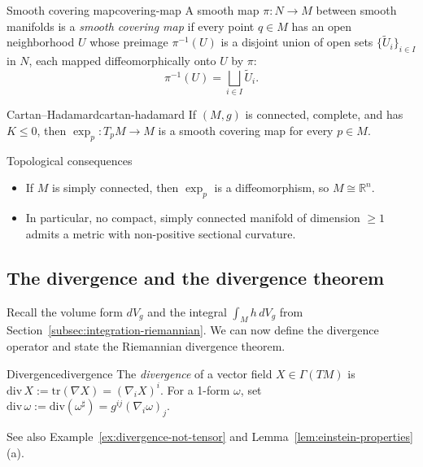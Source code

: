 \begin{colordef}{Smooth covering map}{covering-map}
A smooth map $\pi \colon N \to M$ between smooth manifolds is a \emph{smooth covering map} if every point $q \in M$ has an open neighborhood $U$ whose preimage $\pi^{-1}(U)$ is a disjoint union of open sets $\{\widetilde U_i\}_{i \in I}$ in $N$, each mapped diffeomorphically onto $U$ by $\pi$:
\[
\pi^{-1}(U) = \bigsqcup_{i \in I} \widetilde U_i.
\]
\end{colordef}

\begin{colortheo}{Cartan--Hadamard}{cartan-hadamard}
If $(M, g)$ is connected, complete, and has $K \leqslant 0$, then $\exp_p \colon T_p M \to M$ is a smooth covering map for every $p \in M$.
\end{colortheo}

\begin{colremark}{Topological consequences}{}
\begin{itemize}
    \item If $M$ is simply connected, then $\exp_p$ is a diffeomorphism, so $M \cong \mathbb{R}^n$.
    \item In particular, no compact, simply connected manifold of dimension $\geqslant 1$ admits a metric with non-positive sectional curvature.
\end{itemize}
\end{colremark}


\subsection{The divergence and the divergence theorem}

Recall the volume form $dV_g$ and the integral $\int_M h\, dV_g$ from Section~\ref{subsec:integration-riemannian}. We can now define the divergence operator and state the Riemannian divergence theorem.

\begin{colordef}{Divergence}{divergence}
The \emph{divergence} of a vector field $X \in \Gamma(TM)$ is $\mathrm{div}\, X := \mathrm{tr}(\nabla X) = (\nabla_i X)^i$. For a 1-form $\omega$, set $\mathrm{div}\, \omega := \mathrm{div}(\omega^\sharp) = g^{ij}(\nabla_i \omega)_j$.
\end{colordef}

See also Example~\ref{ex:divergence-not-tensor} and Lemma~\ref{lem:einstein-properties}(a).

